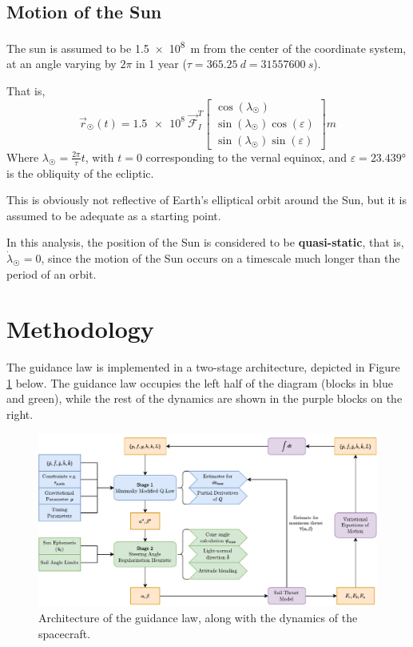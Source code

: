 \subsection{Motion of the Sun}
The sun is assumed to be \qty{1.5e8}{m} from the center of the coordinate system, at an angle varying by $2\pi$ in 1 year ($\tau = \qty{365.25}{d} = \qty{31557600}{s}$).

That is,
\begin{equation}
    \vec{r}_{\astrosun}(t) =
    \num{1.5e8}
    \
    \mathcal{\vec{F}}_I^T
    \begin{bmatrix}
        \cos(\lambda_{\astrosun})                   \\
        \sin(\lambda_{\astrosun}) \cos(\varepsilon) \\
        \sin(\lambda_{\astrosun}) \sin(\varepsilon)
    \end{bmatrix}
    \unit{m}
    \label{eq:sun_position_3d}
\end{equation}
Where $\lambda_{\astrosun} = \frac{2 \pi}{\tau} t$, with $t=0$ corresponding to the vernal equinox, and $\varepsilon = \ang{23.439}$ is the obliquity of the ecliptic.

This is obviously not reflective of Earth's elliptical orbit around the Sun, but it is assumed to be adequate as a starting point.

In this analysis, the position of the Sun is considered to be \textbf{quasi-static}, that is, $\dot{\lambda}_{\astrosun} = 0$, since the motion of the Sun occurs on a timescale much longer than the period of an orbit.

\section{Methodology}
The guidance law is implemented in a
two-stage architecture, depicted in Figure \ref{fig:algorithm_diagram} below. The guidance law occupies the left half of the diagram (blocks in blue and green), while the rest of the dynamics are shown in the purple blocks on the right.

\begin{figure}[H]
    \centering
    \includegraphics[width=\textwidth]{figures/compute_topology.drawio.pdf}
    \caption{Architecture of the guidance law, along with the dynamics of the spacecraft.}
    \label{fig:algorithm_diagram}
\end{figure}

